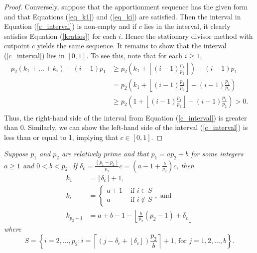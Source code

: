 \documentclass[pdflatex,sn-mathphys-num]{sn-jnl}
\theoremstyle{thmstyleone}%
\theoremstyle{thmstyletwo}%
\theoremstyle{thmstylethree}%
\begin{document}
\begin{proof}
Conversely, suppose that the apportionment sequence has the given form and that Equations (\ref{eq_k1}) and (\ref{eq_ki}) are satisfied. Then the interval in Equation (\ref{c_interval}) is non-empty and if $c$ lies in the interval, it clearly satisfies Equation (\ref{kratios}) for each $i$. Hence the stationary divisor method with cutpoint $c$ yields the same sequence. It remains to show that the interval (\ref{c_interval}) lies in $[0,1].$ To see this, note that for each $i \ge 1$,
\begin{align*}
p_2(k_1+ \ldots +k_i) - (i-1)p_1& \ge p_2\left(k_1+ \left\lfloor (i-1)\frac{p_1}{p_2} \right\rfloor \right)-(i-1)p_1\\
& =p_2\left(k_1+\left\lfloor (i-1)\frac{p_1}{p_2} \right\rfloor -(i-1)\frac{p_1}{p_2}\right) \\
 &\ge p_2 \left(1+\left\lfloor (i-1)\frac{p_1}{p_2} \right\rfloor -(i-1)\frac{p_1}{p_2}\right) >0.\\
\end{align*}
Thus, the right-hand side of the interval from Equation (\ref{c_interval}) is greater than 0. Similarly, we can show the left-hand side of the interval (\ref{c_interval}) is less than or equal to 1, implying that $c \in [0,1]$. 
\end{proof}
 
 
 {\it 
 Suppose  $p_1$ and $p_2$ are relatively prime and that $p_1=ap_2+b$ for some integers $a \ge 1$ and $0< b <p_2$. If $\delta_c =  \frac{(p_1-p_2)}{p_2} c= (a-1+\frac{b}{p_2})c$, then
 \begin{align*}\label{ki_a}
k_1 & = \lfloor \delta_c \rfloor + 1,\\
k_i  & =\left\{ \begin{array}{cl} a+1 & \mbox{ if } i \in S   \\  
a & \mbox{ if }  i \notin S  \end{array} \right. , \mbox{ and}\\
k_{p_2+1} &=a+b-1 - \left\lfloor \frac{b}{p_2} (p_2-1)+ \delta_c \right\rfloor
\end{align*}
where  $$S = \left\{i = 2, \ldots, p_2 : i = \left\lceil (j- \delta_c+ \left\lfloor  \delta_c \right\rfloor)\frac{p_2}{b} \right\rceil + 1 \mbox{, for  } j = 1, 2, \ldots, b\right\}.$$ }
\end{document}
